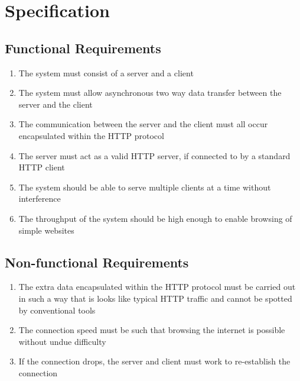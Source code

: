 \section{Specification}
\subsection{Functional Requirements}
\begin{enumerate}
    \item The system must consist of a server and a client
    \item The system must allow asynchronous two way data transfer between the server and the client
    \item The communication between the server and the client must all occur encapsulated within the HTTP protocol
    \item The server must act as a valid HTTP server, if connected to by a standard HTTP client
    \item The system should be able to serve multiple clients at a time without interference
    \item The throughput of the system should be high enough to enable browsing of simple websites
\end{enumerate}
\subsection{Non-functional Requirements}
\begin{enumerate}
    \item The extra data encapsulated within the HTTP protocol must be carried out in such a way that is looks like typical HTTP traffic and cannot be spotted by conventional tools
    \item The connection speed must be such that browsing the internet is possible without undue difficulty
    \item If the connection drops, the server and client must work to re-establish the connection
\end{enumerate}


